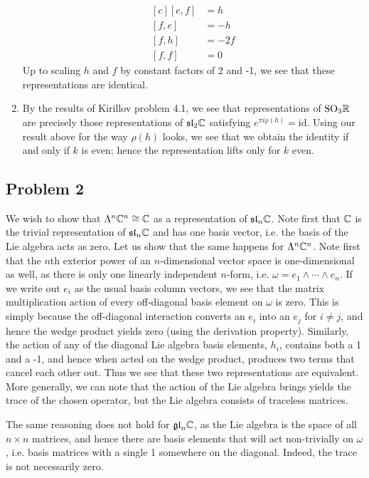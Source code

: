 \documentclass{../../mathnotes}
\begin{document}
\begin{enumerate}
\begin{equation*}
\begin{aligned}[c]
                [e,f]&=h\\
                [f,e]&=-h\\
                [f,h]&=-2f\\
                [f,f]&=0
            \end{aligned}
        \end{equation*}
        Up to scaling $h$ and $f$ by constant factors of 2 and -1, we see that these representations are identical.
    \item By the results of Kirillov problem 4.1, we see that representations of $\text{SO}_3\mathbb{R}$ are precisely those representations of $\mathfrak{sl}_2\mathbb{C}$ satisfying
        $e^{\pi i\rho(h)}=\text{id}$. Using our result above for the way $\rho(h)$ looks, we see that we obtain the identity if and only if $k$ is even; hence
        the representation lifts only for $k$ even.
\end{enumerate}

\subsection*{Problem 2}

We wish to show that $\Lambda^n\mathbb{C}^n\cong \mathbb{C}$ as a representation of $\mathfrak{sl}_n\mathbb{C}$. Note first that $\mathbb{C}$ is the trivial
representation of $\mathfrak{sl}_n\mathbb{C}$ and has one basis vector, i.e. the basis of the Lie algebra acts as zero.
Let us show that the same happens for $\Lambda^n\mathbb{C}^n$. Note first that the $n$th exterior power of an $n$-dimensional vector space
is one-dimensional as well, as there is only one linearly independent $n$-form, i.e. $\omega=e_1\wedge\cdots\wedge e_n$. If we write out $e_i$ as
the usual basis column vectors, we see that the matrix multiplication action of every off-diagonal basis element on $\omega$ is zero.
This is simply because the off-diagonal interaction converts an $e_i$ into an $e_j$ for $i\neq j$, and hence the wedge product yields zero
(using the derivation property).
Similarly, the action of any of the diagonal Lie algebra basis elements, $h_i$, contains both a 1 and a -1, and hence when acted on the wedge product,
produces two terms that cancel each other out. Thus we see that these two representations are equivalent. More generally, we can note that the
action of the Lie algebra brings yields the trace of the chosen operator, but the Lie algebra consists of traceless matrices.

The same reasoning does not hold for $\mathfrak{gl}_n\mathbb{C}$, as the Lie algebra is the space of all $n\times n$ matrices, and hence there are basis elements that
will act non-trivially on $\omega$, i.e. basis matrices with a single 1 somewhere on the diagonal. Indeed, the trace is not necessarily zero.
\end{document}
